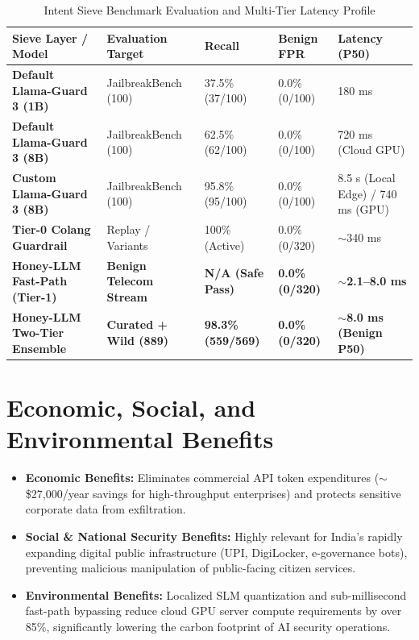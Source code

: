 \documentclass[12pt,a4paper,oneside]{report}
\begin{document}
\begin{table}[H]
\small
\renewcommand{\arraystretch}{1.2}
\begin{tabularx}{\textwidth}{@{}p{1.7in} p{1.3in} p{0.9in} p{0.8in} X@{}}
\rowcolor{HeaderGray} \textbf{Sieve Layer / Model} & \textbf{Evaluation Target} & \textbf{Recall} & \textbf{Benign FPR} & \textbf{Latency (P50)} \\
\hline
\textbf{Default Llama-Guard 3 (1B)}~\cite{llamaguard3} & JailbreakBench (100)~\cite{jailbreakbench2024} & 37.5\% (37/100) & 0.0\% (0/100) & 180 ms \\
\textbf{Default Llama-Guard 3 (8B)}~\cite{llamaguard3} & JailbreakBench (100)~\cite{jailbreakbench2024} & 62.5\% (62/100) & 0.0\% (0/100) & 720 ms (Cloud GPU) \\
\textbf{Custom Llama-Guard 3 (8B)}~\cite{llamaguard3} & JailbreakBench (100)~\cite{jailbreakbench2024} & 95.8\% (95/100) & 0.0\% (0/100) & 8.5 s (Local Edge) / 740 ms (GPU) \\
\textbf{Tier-0 Colang Guardrail}~\cite{nemo2024guardrails} & Replay / Variants & 100\% (Active) & 0.0\% (0/320) & $\sim$340 ms \\
\rowcolor{AccentGreen} \textbf{Honey-LLM Fast-Path (Tier-1)} & \textbf{Benign Telecom Stream} & \textbf{N/A (Safe Pass)} & \textbf{0.0\% (0/320)} & \textbf{$\sim$2.1--8.0 ms} \\
\rowcolor{AccentGreen} \textbf{Honey-LLM Two-Tier Ensemble} & \textbf{Curated + Wild (889)} & \textbf{98.3\% (559/569)} & \textbf{0.0\% (0/320)} & \textbf{$\sim$8.0 ms (Benign P50)} \\
\hline
\end{tabularx}
\caption{Intent Sieve Benchmark Evaluation and Multi-Tier Latency Profile}
\end{table}

\section{Economic, Social, and Environmental Benefits}
\begin{itemize}
    \item \textbf{Economic Benefits:} Eliminates commercial API token expenditures ($\sim$\$27,000/year savings for high-throughput enterprises) and protects sensitive corporate data from exfiltration.
    \item \textbf{Social \& National Security Benefits:} Highly relevant for India's rapidly expanding digital public infrastructure (UPI, DigiLocker, e-governance bots), preventing malicious manipulation of public-facing citizen services.
    \item \textbf{Environmental Benefits:} Localized SLM quantization and sub-millisecond fast-path bypassing reduce cloud GPU server compute requirements by over 85\%, significantly lowering the carbon footprint of AI security operations.
\end{itemize}
\end{document}
